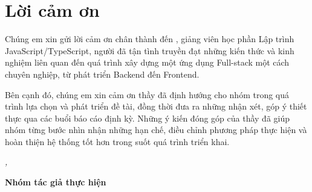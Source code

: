 
\chapter*{Lời cảm ơn}
\label{chap:loi-cam-on}

Chúng em xin gửi lời cảm ơn chân thành đến \instructorName, giảng viên học phần Lập trình JavaScript/TypeScript, người đã tận tình truyền đạt những kiến thức và kinh nghiệm liên quan đến quá trình xây dựng một ứng dụng Full-stack một cách chuyên nghiệp, từ phát triển Backend đến Frontend.

Bên cạnh đó, chúng em xin cảm ơn thầy đã định hướng cho nhóm trong quá trình lựa chọn và phát triển đề tài, đồng thời đưa ra những nhận xét, góp ý thiết thực qua các buổi báo cáo định kỳ. Những ý kiến đóng góp của thầy đã giúp nhóm từng bước nhìn nhận những hạn chế, điều chỉnh phương pháp thực hiện và hoàn thiện hệ thống tốt hơn trong suốt quá trình triển khai.

\vspace{1.5cm}

\begin{flushright}
    \textit{\reportLocation, \reportDate}\par
    \vspace{0.3cm}
    \textbf{Nhóm tác giả thực hiện}
\end{flushright}
